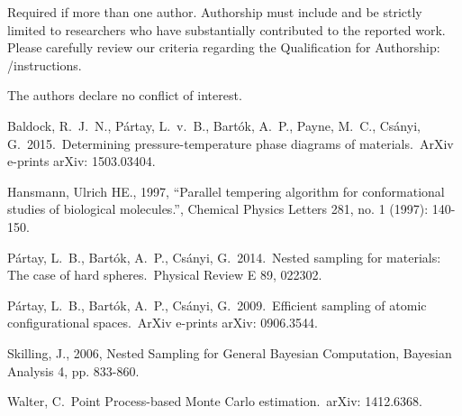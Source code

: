 \documentclass[journal,article,accept,moreauthors,pdftex,12pt,a4paper]{mdpi}
\begin{document}


Required if more than one author. Authorship must include and be strictly limited to researchers who have substantially contributed to the reported work. Please carefully review our criteria regarding the Qualification for Authorship: \web /instructions.


The authors declare no conflict of interest.


\makeatletter
\renewcommand\@biblabel[1]{#1. }
\makeatother

\begin{thebibliography}{999} %

 Baldock, R.~J.~N., 
P{\'a}rtay, L.~v.~B., Bart{\'o}k, A.~P., Payne, M.~C., Cs{\'a}nyi, G.\ 
2015.\ Determining pressure-temperature phase diagrams of materials.\ ArXiv 
e-prints arXiv: 1503.03404. 

 Hansmann, Ulrich HE., 1997, ``Parallel tempering algorithm for conformational studies of biological molecules.'', Chemical Physics Letters 281, no. 1 (1997): 140-150.

 P{\'a}rtay, L.~B., 
Bart{\'o}k, A.~P., Cs{\'a}nyi, G.\ 2014.\ Nested sampling for materials: 
The case of hard spheres.\ Physical Review E 89, 022302. 

 P{\'a}rtay, L.~B., 
Bart{\'o}k, A.~P., Cs{\'a}nyi, G.\ 2009.\ Efficient sampling of atomic 
configurational spaces.\ ArXiv e-prints arXiv: 0906.3544. 

 Skilling, J., 2006, Nested Sampling for General Bayesian Computation, Bayesian Analysis 4, pp. 833-860.

Walter, C.\ Point Process-based Monte Carlo estimation.\ arXiv: 1412.6368.


\end{thebibliography}
\end{document}
